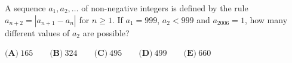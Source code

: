 A sequence $a_1,a_2,\dots$ of non-negative integers is defined by the rule $a_{n+2}=|a_{n+1}-a_n|$ for $n\ge1$. If $a_1=999$, $a_2<999$ and $a_{2006}=1$, how many different values of $a_2$ are possible?

$\textbf{(A)}\ 165\qquad\textbf{(B)}\ 324\qquad\textbf{(C)}\ 495\qquad\textbf{(D)}\ 499\qquad\textbf{(E)}\ 660$

